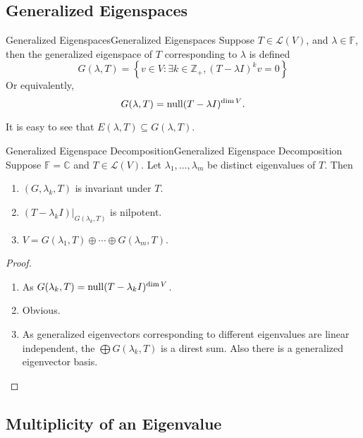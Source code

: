\documentclass[../main.tex]{subfiles}
\begin{document}
\subsection{Generalized Eigenspaces}
\begin{definition}{Generalized Eigenspaces}{Generalized Eigenspaces}
Suppose $T\in \mathscr{L}(V)$, and $\lambda\in \mathbb{F}$, then the generalized eigenspace of $T$ corresponding to $\lambda$ is defined
\begin{equation}
G(\lambda, T) = \left\{ v\in V: \exists k\in \mathbb{Z}_+,(T-\lambda I)^kv = 0 \right\}
\end{equation}
Or equivalently,
\begin{equation*}
G(\lambda,T) = \operatorname{null} (T-\lambda I)^{\dim V}.
\end{equation*}
\end{definition}
It is easy to see that $E(\lambda,T) \subseteq G(\lambda, T)$.

\begin{theorem}{Generalized Eigenspace Decomposition}{Generalized Eigenspace Decomposition}
Suppose $\mathbb{F}=\mathbb{C}$ and $T\in \mathscr{L}(V)$. Let $\lambda_1, \ldots ,\lambda_m$ be distinct eigenvalues of $T$. Then
\begin{enumerate}
	\item $(G,\lambda_k, T)$ is invariant under $T$.
	\item $(T-\lambda_k I)|_{G(\lambda_k,T)}$ is nilpotent.
	\item $V = G(\lambda_1,T) \oplus \cdots \oplus G(\lambda_m,T)$.
\end{enumerate}
\end{theorem}
\begin{proof}
\begin{enumerate}
	\item As $G(\lambda_k, T) = \operatorname{null} (T-\lambda_kI)^{\dim V}$.
	\item Obvious.
	\item As generalized eigenvectors corresponding to different eigenvalues are linear independent, the $\bigoplus G(\lambda_k,T)$ is a direst sum. Also there is a generalized eigenvector basis.
\end{enumerate}
\end{proof}

\subsection{Multiplicity of an Eigenvalue}
\end{document}
